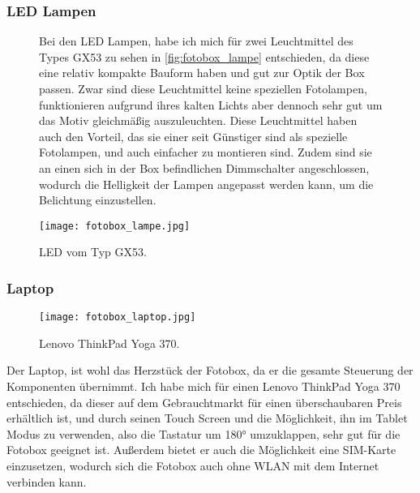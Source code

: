 \subsubsection{LED Lampen}

\begin{figure}[H]
    \centering
    \begin{minipage}{0.4\textwidth}
        \small
        Bei den LED Lampen, habe ich mich für zwei Leuchtmittel des Types GX53 
        zu sehen in \autoref{fig:fotobox_lampe} entschieden, da diese eine
        relativ kompakte Bauform haben und gut zur Optik der Box passen. 
        Zwar sind diese Leuchtmittel keine speziellen Fotolampen, funktionieren
        aufgrund ihres kalten Lichts aber dennoch sehr gut um das Motiv
        gleichmäßig auszuleuchten. Diese Leuchtmittel haben auch den Vorteil,
        das sie einer seit Günstiger sind als spezielle Fotolampen, und 
        auch einfacher zu montieren sind. Zudem sind sie an einen sich in 
        der Box befindlichen Dimmschalter angeschlossen, wodurch die 
        Helligkeit der Lampen angepasst werden kann, um die Belichtung einzustellen.
    \end{minipage}
    \hfill
    \begin{minipage}{0.5\textwidth}
        \texttt{[image: fotobox\_lampe.jpg]}
        \caption{LED vom Typ GX53.}
        \label{fig:fotobox_lampe}
    \end{minipage}    
\end{figure}

\subsubsection{Laptop}

\begin{figure}[H]
    \centering
    \texttt{[image: fotobox\_laptop.jpg]}
    \caption{Lenovo ThinkPad Yoga 370.}
    \label{fig:fotobox_laptop}
\end{figure}

Der Laptop, ist wohl das Herzstück der Fotobox, da er die gesamte 
Steuerung der Komponenten übernimmt. Ich habe mich für einen
Lenovo ThinkPad Yoga 370 entschieden, da dieser auf dem Gebrauchtmarkt
für einen überschaubaren Preis erhältlich ist, und durch seinen Touch
Screen und die Möglichkeit, ihn im Tablet Modus zu verwenden,
also die Tastatur um 180° umzuklappen, sehr gut für die Fotobox
geeignet ist. Außerdem bietet er auch die Möglichkeit eine SIM-Karte
einzusetzen, wodurch sich die Fotobox auch ohne WLAN mit dem Internet 
verbinden kann.

